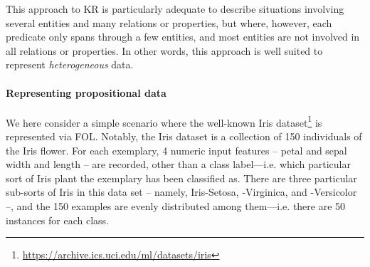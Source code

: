 \documentclass[12pt,a4paper,openright,twoside]{book}
\begin{document}
This approach to KR is particularly adequate to describe situations involving several entities and many relations or properties, but where, however, each predicate only spans through a few entities, and most entities are not involved in all relations or properties.
%
In other words, this approach is well suited to represent \emph{heterogeneous} data.

\paragraph{Representing propositional data}\label{sec:kr-tabular-data}

We here consider a simple scenario where the well-known Iris dataset\footnote{\url{https://archive.ics.uci.edu/ml/datasets/iris}} is represented via FOL.
%
Notably, the Iris dataset is a collection of 150 individuals of the Iris flower.
%
For each exemplary, 4 numeric input features -- petal and sepal width and length -- are recorded, other than a class label---i.e. which particular sort of Iris plant the exemplary has been classified as.
%
There are three particular sub-sorts of Iris in this data set -- namely, Iris-Setosa, -Virginica, and -Versicolor --, and the 150 examples are evenly distributed among them---i.e. there are 50 instances for each class.
\end{document}
